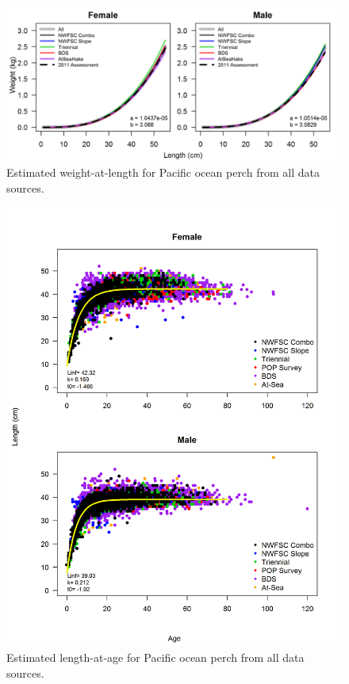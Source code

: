 \documentclass[12pt,]{article}
\begin{document}
\begin{figure}
\centering
\includegraphics{Figures/weightAtLengthPred.png}
\caption{Estimated weight-at-length for Pacific ocean perch from all
data sources. \label{fig:Wt_len_pred}}
\end{figure}

\begin{figure}
\centering
\includegraphics{Figures/LengthAgeAll.png}
\caption{Estimated length-at-age for Pacific ocean perch from all data
sources. \label{fig:Len_Age}}
\end{figure}
\end{document}
